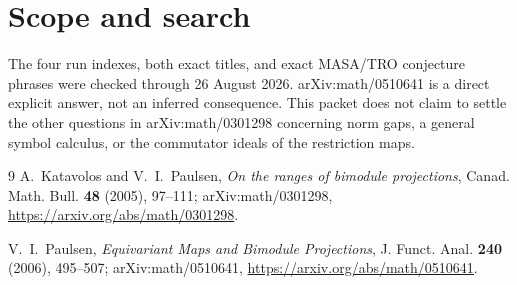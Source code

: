 \documentclass[11pt]{article}
\begin{document}
\section*{Scope and search}

The four run indexes, both exact titles, and exact MASA/TRO conjecture phrases
were checked through 26 August 2026.  arXiv:math/0510641 is a direct explicit
answer, not an inferred consequence.  This packet does not claim to settle
the other questions in arXiv:math/0301298 concerning norm gaps, a general
symbol calculus, or the commutator ideals of the restriction maps.

\begin{thebibliography}{9}
A.~Katavolos and V.~I.~Paulsen,
\emph{On the ranges of bimodule projections},
Canad. Math. Bull. \textbf{48} (2005), 97--111;
arXiv:math/0301298,
\url{https://arxiv.org/abs/math/0301298}.

V.~I.~Paulsen,
\emph{Equivariant Maps and Bimodule Projections},
J. Funct. Anal. \textbf{240} (2006), 495--507;
arXiv:math/0510641,
\url{https://arxiv.org/abs/math/0510641}.
\end{thebibliography}
\end{document}
